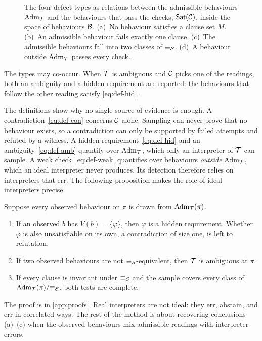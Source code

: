 \begin{figure}[t]
\centering
\resizebox{\textwidth}{!}{}
\caption{The four defect types as relations between the admissible behaviours $\mathrm{Adm}_{\mathcal{T}}$ and the behaviours that pass the checks, $\textsf{Sat}(\mathcal{C})$, inside the space of behaviours $\mathcal{B}$. (a)~No behaviour satisfies a clause set $M$. (b)~An admissible behaviour fails exactly one clause. (c)~The admissible behaviours fall into two classes of $\equiv_{\mathcal{S}}$. (d)~A behaviour outside $\mathrm{Adm}_{\mathcal{T}}$ passes every check.}
\label{fig:taxonomy}
\end{figure}

The types may co-occur. When $\mathcal{T}$ is ambiguous and $\mathcal{C}$ picks one of the readings, both an ambiguity and a hidden requirement are reported: the behaviours that follow the other reading satisfy \eqref{eq:def-hid}.

The definitions show why no single source of evidence is enough. A contradiction~\eqref{eq:def-con} concerns $\mathcal{C}$ alone. Sampling can never prove that no behaviour exists, so a contradiction can only be supported by failed attempts and refuted by a witness. A hidden requirement~\eqref{eq:def-hid} and an ambiguity~\eqref{eq:def-amb} quantify over $\mathrm{Adm}_{\mathcal{T}}$, which only an interpreter of $\mathcal{T}$ can sample. A weak check~\eqref{eq:def-weak} quantifies over behaviours \emph{outside} $\mathrm{Adm}_{\mathcal{T}}$, which an ideal interpreter never produces. Its detection therefore relies on interpreters that err. The following proposition makes the role of ideal interpreters precise.

\begin{proposition}
\label{prop:ideal}
Suppose every observed behaviour on $\pi$ is drawn from $\mathrm{Adm}_{\mathcal{T}}(\pi)$.
\begin{enumerate}[leftmargin=*,label=(\alph*)]
\item If an observed $b$ has $V(b)=\{\varphi\}$, then $\varphi$ is a hidden requirement. Whether $\varphi$ is also unsatisfiable on its own, a contradiction of size one, is left to refutation.
\item If two observed behaviours are not $\equiv_{\mathcal{S}}$-equivalent, then $\mathcal{T}$ is ambiguous at $\pi$.
\item If every clause is invariant under $\equiv_{\mathcal{S}}$ and the sample covers every class of $\mathrm{Adm}_{\mathcal{T}}(\pi)/{\equiv_{\mathcal{S}}}$, both tests are complete.
\end{enumerate}
\end{proposition}
The proof is in \cref{app:proofs}. Real interpreters are not ideal: they err, abstain, and err in correlated ways. The rest of the method is about recovering conclusions (a)--(c) when the observed behaviours mix admissible readings with interpreter errors.

